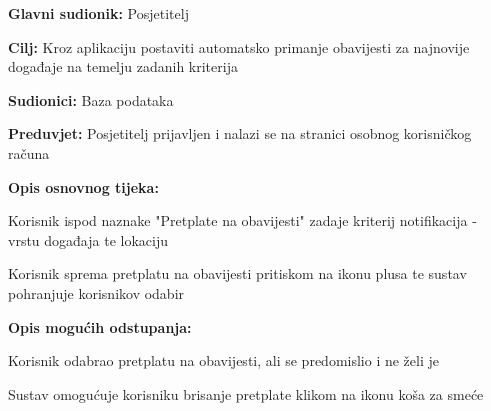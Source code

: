 					\noindent {}
\begin{packed_item}
	\item \textbf{Glavni sudionik:} Posjetitelj
	\item  \textbf{Cilj:} Kroz aplikaciju postaviti automatsko primanje obavijesti za najnovije događaje na temelju zadanih kriterija
	\item  \textbf{Sudionici:} Baza podataka
	\item  \textbf{Preduvjet:} Posjetitelj prijavljen i nalazi se na stranici osobnog korisničkog računa
	\item  \textbf{Opis osnovnog tijeka:}
	
	\item[] \begin{packed_enum}
		
		\item Korisnik ispod naznake "Pretplate na obavijesti" zadaje kriterij notifikacija - vrstu događaja te lokaciju
		\item Korisnik sprema pretplatu na obavijesti pritiskom na ikonu plusa te sustav pohranjuje korisnikov odabir
	\end{packed_enum}
	
	
	\item  \textbf{Opis mogućih odstupanja:}
		\item[] \begin{packed_item}
	\item[2.a] Korisnik odabrao pretplatu na obavijesti, ali se predomislio i ne želi je
	\item[] \begin{packed_enum}
		
		\item Sustav omogućuje korisniku brisanje pretplate klikom na ikonu koša za smeće
		
	\end{packed_enum}
\end{packed_item}
\end{packed_item}

